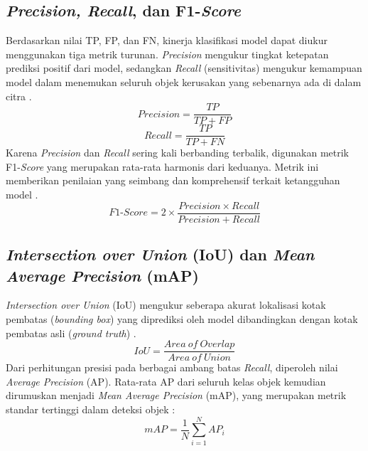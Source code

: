 \subsection{\textit{Precision, Recall}, dan F1-\textit{Score}}
Berdasarkan nilai TP, FP, dan FN, kinerja klasifikasi model dapat diukur menggunakan tiga metrik turunan. \textit{Precision} mengukur tingkat ketepatan prediksi positif dari model, sedangkan \textit{Recall} (sensitivitas) mengukur kemampuan model dalam menemukan seluruh objek kerusakan yang sebenarnya ada di dalam citra \cite{Zeng2024, Li2024}.
\begin{equation}
	Precision = \frac{TP}{TP + FP}
\end{equation}
\begin{equation}
	Recall = \frac{TP}{TP + FN}
\end{equation}
Karena \textit{Precision} dan \textit{Recall} sering kali berbanding terbalik, digunakan metrik F1-\textit{Score} yang merupakan rata-rata harmonis dari keduanya. Metrik ini memberikan penilaian yang seimbang dan komprehensif terkait ketangguhan model \cite{Li2024}.
\begin{equation}
	F1\text{-}Score = 2 \times \frac{Precision \times Recall}{Precision + Recall}
\end{equation}

\subsection{\textit{Intersection over Union} (IoU) dan \textit{Mean Average Precision} (mAP)}
\textit{Intersection over Union} (IoU) mengukur seberapa akurat lokalisasi kotak pembatas (\textit{bounding box}) yang diprediksi oleh model dibandingkan dengan kotak pembatas asli (\textit{ground truth}) \cite{Li2024}.
\begin{equation}
	IoU = \frac{Area \ of \ Overlap}{Area \ of \ Union}
\end{equation}
Dari perhitungan presisi pada berbagai ambang batas \textit{Recall}, diperoleh nilai \textit{Average Precision} (AP). Rata-rata AP dari seluruh kelas objek kemudian dirumuskan menjadi \textit{Mean Average Precision} (mAP), yang merupakan metrik standar tertinggi dalam deteksi objek \cite{Wu2023, Li2024}:
\begin{equation}
	mAP = \frac{1}{N} \sum_{i=1}^{N} AP_i
\end{equation}

